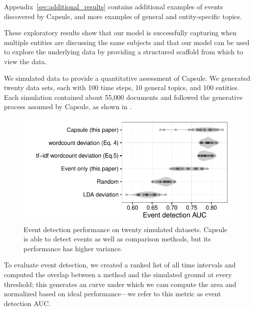 Appendix~\ref{sec:additional_results} contains additional examples of events discovered by Capsule, and more examples of general and entity-specific topics.

These exploratory results show that our model is successfully capturing when multiple entities are discussing the same subjects and that our model can be used to explore the underlying data by providing a structured scaffold from which to view the data.

  We simulated data to provide a quantitative assessment of Capsule.
We generated twenty data sets, each with 100 time steps, 10 general topics, and 100 entities. Each simulation contained about 55,000 documents and followed the generative process assumed by Capsule, as shown in .

\begin{figure}[t]
\centering
\includegraphics[width=\linewidth]{fig/sim_eventdetect.pdf}
\caption{Event detection performance on twenty simulated datasets.  Capsule is able to detect events as well as comparison methods, but its performance has higher variance.}
\label{fig:sim_eventdetect}
\end{figure}

To evaluate event detection, we created a ranked list of all time intervals and computed the overlap between a method and the simulated ground at every threshold; this generates an curve under which we cam compute the area and normalized based on ideal performance---we refer to this metric as event detection AUC. 

 
